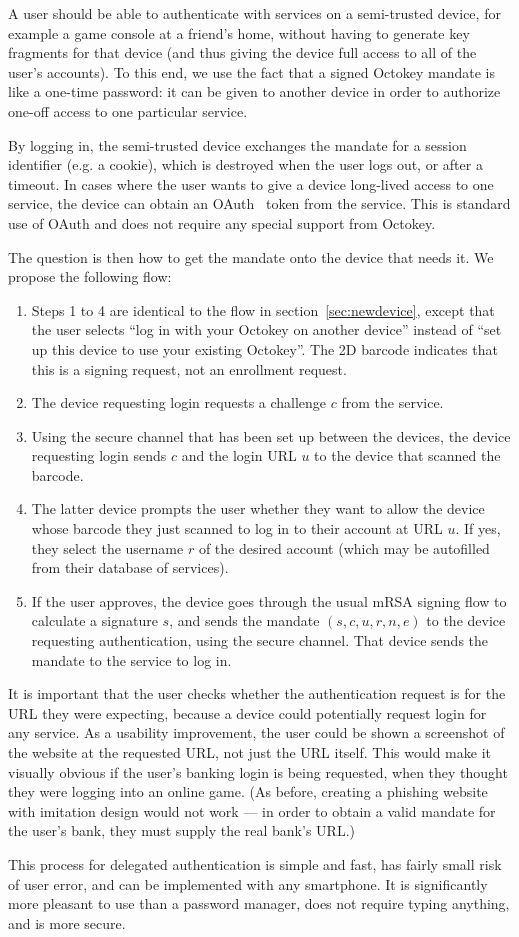 A user should be able to authenticate with services on a semi-trusted device, for example a game
console at a friend's home, without having to generate key fragments for that device (and thus
giving the device full access to all of the user's accounts). To this end, we use the fact that a
signed Octokey mandate is like a one-time password: it can be given to another device in order to
authorize one-off access to one particular service.

By logging in, the semi-trusted device exchanges the mandate for a session identifier (e.g. a
cookie), which is destroyed when the user logs out, or after a timeout. In cases where the user
wants to give a device long-lived access to one service, the device can obtain an OAuth~\cite{OAuth}
token from the service. This is standard use of OAuth and does not require any special support from
Octokey.

The question is then how to get the mandate onto the device that needs it. We propose the following
flow:

\begin{enumerate}
\item Steps 1 to 4 are identical to the flow in section~\ref{sec:newdevice}, except that the user
selects ``log in with your Octokey on another device'' instead of ``set up this device to use your
existing Octokey''. The 2D barcode indicates that this is a signing request, not an enrollment
request.
\item The device requesting login requests a challenge $c$ from the service.
\item Using the secure channel that has been set up between the devices, the device requesting login
sends $c$ and the login URL $u$ to the device that scanned the barcode.
\item The latter device prompts the user whether they want to allow the device whose barcode they
just scanned to log in to their account at URL $u$. If yes, they select the username $r$ of the
desired account (which may be autofilled from their database of services).
\item If the user approves, the device goes through the usual mRSA signing flow to calculate a
signature $s$, and sends the mandate $(s, c, u, r, n, e)$ to the device requesting authentication,
using the secure channel. That device sends the mandate to the service to log in.
\end{enumerate}

It is important that the user checks whether the authentication request is for the URL they were
expecting, because a device could potentially request login for any service. As a usability
improvement, the user could be shown a screenshot of the website at the requested URL, not just the
URL itself. This would make it visually obvious if the user's banking login is being requested, when
they thought they were logging into an online game. (As before, creating a phishing website with
imitation design would not work --- in order to obtain a valid mandate for the user's bank, they
must supply the real bank's URL.)

This process for delegated authentication is simple and fast, has fairly small risk of user error,
and can be implemented with any smartphone. It is significantly more pleasant to use than a password
manager, does not require typing anything, and is more secure.
